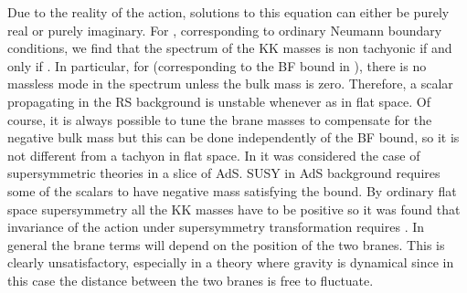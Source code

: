 \documentclass[a4paper,12pt,dvips]{article}
\begin{document}
Due to the reality of the action, solutions to this equation can
either be purely real or purely imaginary. For \coordHE{},
corresponding to ordinary Neumann boundary conditions, we find
that the spectrum of the KK masses is non tachyonic if and only if
\coordHE{}. In particular, for \coordHE{} (corresponding to
the BF bound in \coordHE{}), there is no massless mode in the spectrum
unless the bulk mass is zero. Therefore, a scalar propagating in
the RS background is unstable whenever \coordHE{} as in flat space.
Of course, it is always possible to tune the brane masses to
compensate for the negative bulk mass but this can be done
independently of the BF bound, so it is not different from a
tachyon in flat space. In \cite{pomarol} it was considered the
case of supersymmetric theories in a slice of AdS\coordHE{}. SUSY in AdS
background requires some of the scalars to have negative mass
satisfying the bound. By ordinary \coordHE{} flat space supersymmetry
all the KK masses have to be positive so it was found that
invariance of the action under supersymmetry transformation
requires \coordHE{}. In general the brane terms will
depend on the position of the two branes. This is clearly
unsatisfactory, especially in a theory where gravity is dynamical
since in this case the distance between the two branes is free to
fluctuate.
\end{document}

